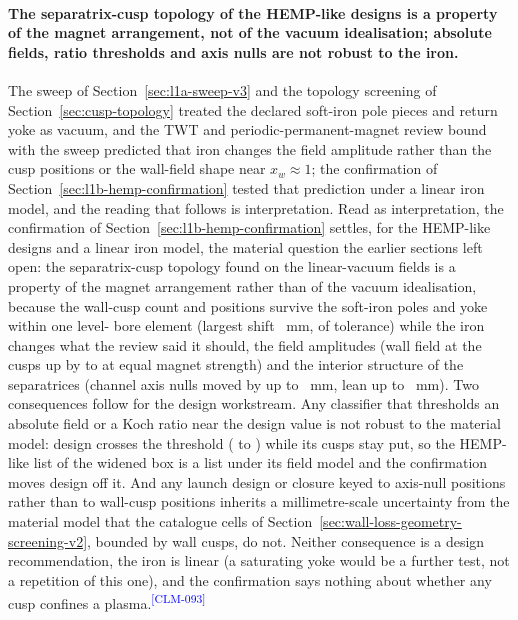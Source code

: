 \documentclass[11pt]{article}
\newcommand{\EvidenceClaim}[2]{#2\textsuperscript{\textcolor{blue}{[#1]}}}
\begin{document}
\paragraph{The separatrix-cusp topology of the HEMP-like designs is a property of
the magnet arrangement, not of the vacuum idealisation; absolute fields, ratio
thresholds and axis nulls are not robust to the iron.}
The sweep of Section~\ref{sec:l1a-sweep-v3} and the topology screening of
Section~\ref{sec:cusp-topology} treated the declared soft-iron pole pieces and
return yoke as vacuum, and the TWT and periodic-permanent-magnet review bound with
the sweep predicted that iron changes the field amplitude rather than the cusp
positions or the wall-field shape near $x_w \approx 1$; the confirmation of
Section~\ref{sec:l1b-hemp-confirmation} tested that prediction under a linear iron
model, and the reading that follows is interpretation.
\EvidenceClaim{CLM-093}{Read as interpretation, the confirmation of
Section~\ref{sec:l1b-hemp-confirmation} settles, for the \HmcDesignCount{}
HEMP-like designs and a linear iron model, the material question the earlier
sections left open: the separatrix-cusp topology found on the linear-vacuum fields
is a property of the magnet arrangement rather than of the vacuum idealisation,
because the wall-cusp count and positions survive the soft-iron poles and yoke
within one level-\HmcLevelZeroToken{} bore element (largest shift
\HmcShiftMaxMm~mm, \HmcGateCMaxShiftOverTol{} of tolerance) while the iron changes
what the review said it should, the field amplitudes (wall field at the cusps up by
\HmcWallBRaiseMinPct{} to \HmcWallBRaiseMaxPct{} at equal magnet strength) and the
interior structure of the separatrices (channel axis nulls moved by up to
\HmcChannelNullShiftMaxMm~mm, lean up to \HmcLeanPTwoMaxMm~mm). Two consequences
follow for the design workstream. Any classifier that thresholds an absolute field
or a Koch ratio near the design value is not robust to the material model: design
\texttt{\HmcLostDesign} crosses the \HmcRhoThreshold{} threshold
(\HmcLostDesignLOneARho{} to \HmcLostDesignPTwoRho) while its cusps stay put, so
the HEMP-like list of the widened box is a list under its field model and the
confirmation moves \HmcLostDesigns{} design off it. And any launch design or
closure keyed to axis-null positions rather than to wall-cusp positions inherits
a millimetre-scale uncertainty from the material model that the catalogue cells of
Section~\ref{sec:wall-loss-geometry-screening-v2}, bounded by wall cusps, do not.
Neither consequence is a design recommendation, the iron is linear (a saturating
yoke would be a further test, not a repetition of this one), and the confirmation
says nothing about whether any cusp confines a plasma.}
\end{document}
